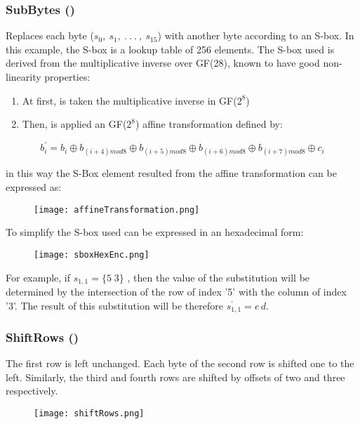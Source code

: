 \documentclass{article}
\begin{document}
\subsubsection{SubBytes ()}
Replaces each byte ($s_0,\: s_1,\: .\: .\: .\: ,\: s_15$) with another byte according to an S-box. In this example, the S-box is a lookup table of 256 elements.
The S-box used is derived from the multiplicative inverse over GF(28), known to have good non-linearity properties:
\begin{enumerate}
    \item At first, is taken the multiplicative inverse in GF($2^8$)
    \item Then, is applied an GF($2^8$) affine transformation defined by:
\end{enumerate}
 \[b^{'}_i  =  b_i\oplus b_{(i+4)mod 8}\oplus  b_{(i+5) mod 8 }\oplus b_{(i+6) mod 8} \oplus b_{(i+7) mod 8} \oplus  c_i\]

in this way the S-Box element resulted from the affine transformation can be expressed as:
\begin{figure}[H]
	\begin{center}
  		\texttt{[image: affineTransformation.png]} 
 	\end{center}
\end{figure}
To simplify the S-box used can be expressed in an hexadecimal form:
 \begin{figure}[H]
	\begin{center}
  		\texttt{[image: sboxHexEnc.png]} 
 	\end{center}
\end{figure}
\label{sec:sboxEnc}
For example, if $s_{1,1}= \{ 5\; 3 \}$ , then the value of the substitution will be determined by the intersection of the row of index '5' with the column of index '3'. The result of this substitution will be therefore $s_{1,1}^{’}={e\,d}$.

\subsubsection{ ShiftRows ()}
The first row is left unchanged. Each byte of the second row is shifted one to the left. Similarly, the third and fourth rows are shifted by offsets of two and three respectively.
\begin{figure}[H]
	\begin{center}
  		\texttt{[image: shiftRows.png]} 
 	\end{center}
\end{figure}
\end{document}
